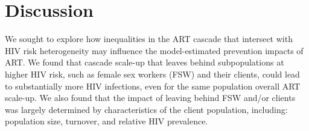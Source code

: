 \section{Discussion}\label{art.disc}
We sought to explore how inequalities in the ART cascade
that intersect with HIV risk heterogeneity
may influence the model-estimated prevention impacts of ART.
We found that cascade scale-up that leaves behind subpopulations at higher HIV risk,
such as female sex workers (FSW) and their clients,
could lead to substantially more HIV infections,
even for the same population overall ART scale-up.
We also found that the impact of
leaving behind FSW and/or clients was largely determined by
characteristics of the client population, including:
population size, turnover, and relative HIV prevalence.
\par
